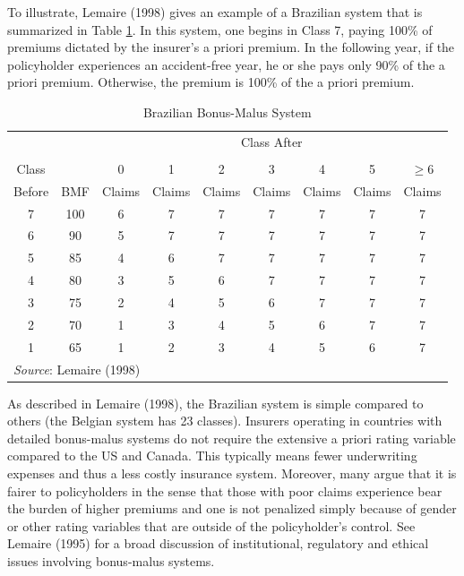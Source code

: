 To illustrate, Lemaire (1998) gives an example of a Brazilian system
that is summarized in Table \ref{T18:BrazilBMF}. In this system, one
begins in Class 7, paying 100\% of premiums dictated by the
insurer's a priori premium. In the following year, if the
policyholder experiences an accident-free year, he or she pays only
90\% of the a priori premium. Otherwise, the premium is 100\% of the
a priori premium.

\begin{table}[h]\begin{center}
 \caption{\label{T18:BrazilBMF} Brazilian Bonus-Malus
System}
\begin{tabular}{ccccccccc}
  \hline
   &  & \multicolumn{7}{c}{Class After}\\ \cline{3-9}\vspace{-.05in}\\
  Class  &      &  0 & 1 & 2 & 3 & 4 & 5 & $\geq 6$ \\
  Before & BMF & Claims & Claims & Claims & Claims & Claims & Claims & Claims \\  \hline
  7 & 100       & 6 & 7 & 7 & 7 & 7 & 7 & 7 \\
  6 & 90        & 5 & 7 & 7 & 7 & 7 & 7 & 7 \\
  5 & 85        & 4 & 6 & 7 & 7 & 7 & 7 & 7 \\
  4 & 80        & 3 & 5 & 6 & 7 & 7 & 7 & 7 \\
  3 & 75        & 2 & 4 & 5 & 6 & 7 & 7 & 7 \\
  2 & 70        & 1 & 3 & 4 & 5 & 6 & 7 & 7 \\
  1 & 65        & 1 & 2 & 3 & 4 & 5 & 6 & 7 \\
  \hline
   \multicolumn{9}{l}{\textit{Source}: Lemaire (1998)}
\end{tabular}\end{center}
\end{table}

As described in Lemaire (1998), the Brazilian system is simple
compared to others (the Belgian system has 23 classes). Insurers
operating in countries with detailed bonus-malus systems do not
require the extensive a priori rating variable compared to the US
and Canada. This typically means fewer underwriting expenses and
thus a less costly insurance system. Moreover, many argue that it is
fairer to policyholders in the sense that those with poor claims
experience bear the burden of higher premiums and one is not
penalized simply because of gender or other rating variables that
are outside of the policyholder's control. See Lemaire (1995) for a
broad discussion of institutional, regulatory and ethical issues
involving bonus-malus systems.


